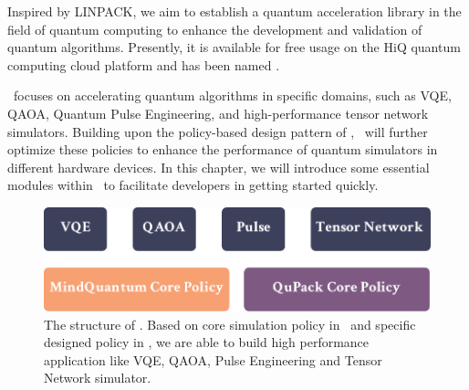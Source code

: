 Inspired by LINPACK\cite{dongarra1979linpack}, we aim to establish a quantum acceleration library in the field of quantum computing to enhance the development and validation of quantum algorithms. Presently, it is available for free usage on the HiQ quantum computing cloud platform and has been named \QuPack.

\QuPack\ focuses on accelerating quantum algorithms in specific domains, such as VQE, QAOA, Quantum Pulse Engineering, and high-performance tensor network simulators. Building upon the policy-based design pattern of \MindQuantum, \QuPack\ will further optimize these policies to enhance the performance of quantum simulators in different hardware devices. In this chapter, we will introduce some essential modules within \QuPack\ to facilitate developers in getting started quickly.

\begin{figure}[ht]
    \centering
    \includegraphics[scale=0.5]{./images/6_qupack_layer.pdf}
    \captionsetup{justification=raggedright,singlelinecheck=false}
    \caption{\label{6_qupack_layer} The structure of \QuPack. Based on core simulation policy in \MindQuantum\ and specific designed policy in \QuPack, we are able to build high performance application like VQE, QAOA, Pulse Engineering and Tensor Network simulator.}
\end{figure}
